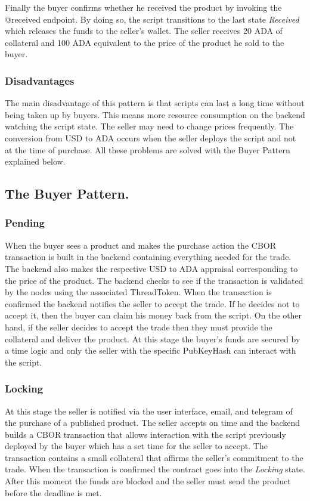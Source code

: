 \documentclass[12pt]{article}
\begin{document}
Finally the buyer confirms whether he received the product by invoking the @received endpoint. By doing so, the script transitions to the last state \emph{Received} which releases the funds to the seller's wallet. The seller receives 20 ADA of collateral and 100 ADA equivalent to the price of the product he sold to the buyer.

\subsubsection { Disadvantages }

The main disadvantage of this pattern is that scripts can last a long time without being taken up by buyers.
This means more resource consumption on the backend watching the script state. The seller may need to change prices frequently. The conversion from USD to ADA occurs when the seller deploys the script and not at the time of purchase. All these problems are solved with the Buyer Pattern explained below.
 
\subsection { The Buyer Pattern. } 

\subsubsection { Pending }

When the buyer sees a product and makes the purchase action the CBOR transaction is built in the backend containing everything needed for the trade. The backend also makes the respective USD to ADA appraisal corresponding to the price of the product. The backend checks to see if the transaction is validated by the nodes using the associated ThreadToken. When the transaction is confirmed the backend notifies the seller to accept the trade. If he decides not to accept it, then the buyer can claim his money back from the script. On the other hand, if the seller decides to accept the trade then they must provide the collateral and deliver the product. At this stage the buyer's funds are secured by a time logic and only the seller with the specific PubKeyHash can interact with the script.

\subsubsection { Locking }

At this stage the seller is notified via the user interface, email, and telegram of the purchase of a published product. The seller accepts on time and the backend builds a CBOR transaction that allows interaction with the script previously deployed by the buyer which has a set time for the seller to accept. The transaction contains a small collateral that affirms the seller's commitment to the trade. When the transaction is confirmed the contract goes into the \emph{Locking} state. After this moment the funds are blocked and the seller must send the product before the deadline is met.
\end{document}
